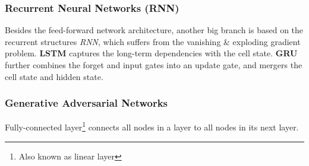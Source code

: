 \subsubsection{Recurrent Neural Networks (RNN)} \hfill 

Besides the feed-forward network architecture, another big branch is based on the recurrent structures \emph{RNN}, which suffers from the vanishing \& exploding gradient problem. \textbf{LSTM} captures the long-term dependencies with the cell state. \textbf{GRU} further combines the forget and input gates into an update gate, and mergers the cell state and hidden state. 

\subsubsection{Generative Adversarial Networks}\hfill 

Fully-connected layer\footnote{Also known as linear layer} connects all nodes in a layer to all nodes in its next layer.







